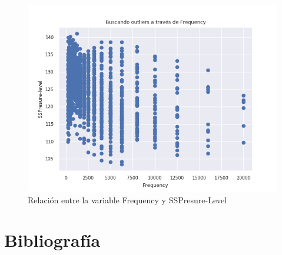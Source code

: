 \begin{figure}[H] %
	\centering
	\includegraphics[scale=0.6]{freq-ssp.png}  %
	\caption{Relación entre la variable Frequency y SSPresure-Level} 
	\label{fig:freq-ssp}
\end{figure}



\newpage
\section{Bibliografía}




